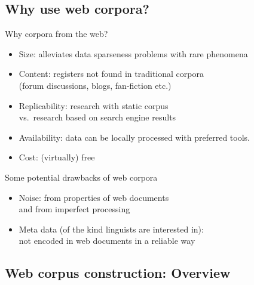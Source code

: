 \subsection{Why use web corpora?}

\begin{frame}
  {Why corpora from the web?}

  \begin{itemize}
  \item \alert{Size}: alleviates data sparseness problems with rare phenomena
  \item \alert{Content}: registers not found in traditional corpora\\ (forum discussions, blogs, fan-fiction etc.)
  \item \alert{Replicability}: research with static corpus\\
    vs.\ research based on search engine results
  \item \alert{Availability}: data can be locally processed with preferred tools.
  \item \alert{Cost}: (virtually) free
  \end{itemize}
\end{frame}


\begin{frame}
  {Some potential drawbacks of web corpora}

  \begin{itemize}
  \item \alert{Noise}: from properties of web documents\\
    and from imperfect processing
  \item \alert{Meta data} (of the kind linguists are interested in):\\
    not encoded in web documents in a reliable way
  \end{itemize}
\end{frame}


\subsection{Web corpus construction: Overview}

